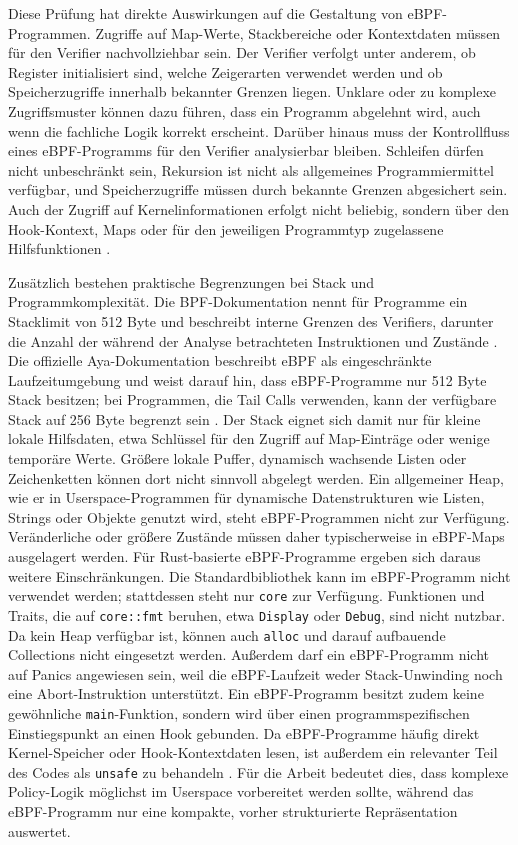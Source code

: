 Diese Prüfung hat direkte Auswirkungen auf die Gestaltung von eBPF-Programmen. 
Zugriffe auf Map-Werte, Stackbereiche oder Kontextdaten müssen für den Verifier nachvollziehbar sein. 
Der Verifier verfolgt unter anderem, ob Register initialisiert sind, welche Zeigerarten verwendet werden und ob Speicherzugriffe innerhalb bekannter Grenzen liegen. 
Unklare oder zu komplexe Zugriffsmuster können dazu führen, dass ein Programm abgelehnt wird, auch wenn die fachliche Logik korrekt erscheint.
Darüber hinaus muss der Kontrollfluss eines eBPF-Programms für den Verifier analysierbar bleiben.
Schleifen dürfen nicht unbeschränkt sein, Rekursion ist nicht als allgemeines Programmiermittel verfügbar, und Speicherzugriffe müssen durch bekannte Grenzen abgesichert sein.
Auch der Zugriff auf Kernelinformationen erfolgt nicht beliebig, sondern über den Hook-Kontext, Maps oder für den jeweiligen Programmtyp zugelassene Hilfsfunktionen \citep{kernelBpfVerifier}.


Zusätzlich bestehen praktische Begrenzungen bei Stack und Programmkomplexität. 
Die BPF-Dokumentation nennt für Programme ein Stacklimit von 512 Byte und beschreibt interne Grenzen des Verifiers, darunter die Anzahl der während der Analyse betrachteten Instruktionen und Zustände \citep{kernelBpfDesignQA}.
Die offizielle Aya-Dokumentation beschreibt eBPF als eingeschränkte Laufzeitumgebung und weist darauf hin, dass eBPF-Programme nur 512 Byte Stack besitzen; bei Programmen, die Tail Calls verwenden, kann der verfügbare Stack auf 256 Byte begrenzt sein \citep{ayaBook}. 
Der Stack eignet sich damit nur für kleine lokale Hilfsdaten, etwa Schlüssel für den Zugriff auf Map-Einträge oder wenige temporäre Werte.
Größere lokale Puffer, dynamisch wachsende Listen oder Zeichenketten können dort nicht sinnvoll abgelegt werden. 
Ein allgemeiner Heap, wie er in Userspace-Programmen für dynamische Datenstrukturen wie Listen, Strings oder Objekte genutzt wird, steht eBPF-Programmen nicht zur Verfügung. 
Veränderliche oder größere Zustände müssen daher typischerweise in eBPF-Maps ausgelagert werden.
Für Rust-basierte eBPF-Programme ergeben sich daraus weitere Einschränkungen.
Die Standardbibliothek kann im eBPF-Programm nicht verwendet werden; stattdessen steht nur \texttt{core} zur Verfügung.
Funktionen und Traits, die auf \texttt{core::fmt} beruhen, etwa \texttt{Display} oder \texttt{Debug}, sind nicht nutzbar.
Da kein Heap verfügbar ist, können auch \texttt{alloc} und darauf aufbauende Collections nicht eingesetzt werden.
Außerdem darf ein eBPF-Programm nicht auf Panics angewiesen sein, weil die eBPF-Laufzeit weder Stack-Unwinding noch eine Abort-Instruktion unterstützt.
Ein eBPF-Programm besitzt zudem keine gewöhnliche \texttt{main}-Funktion, sondern wird über einen programmspezifischen Einstiegspunkt an einen Hook gebunden.
Da eBPF-Programme häufig direkt Kernel-Speicher oder Hook-Kontextdaten lesen, ist außerdem ein relevanter Teil des Codes als \texttt{unsafe} zu behandeln \citep{ayaBook}.
Für die Arbeit bedeutet dies, dass komplexe Policy-Logik möglichst im Userspace vorbereitet werden sollte, während das eBPF-Programm nur eine kompakte, vorher strukturierte Repräsentation auswertet.

